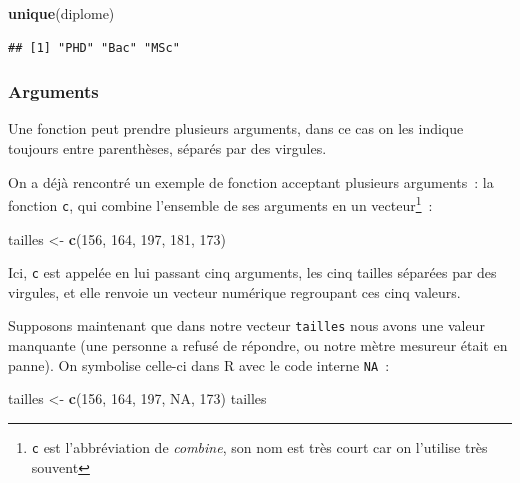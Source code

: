 \documentclass[12pt,]{book}
\newenvironment{Shaded}{\begin{snugshade}}{\end{snugshade}}
\newcommand{\DecValTok}[1]{\textcolor[rgb]{0.06,0.06,0.06}{#1}}
\newcommand{\KeywordTok}[1]{\textcolor[rgb]{0.27,0.27,0.27}{\textbf{#1}}}
\newcommand{\NormalTok}[1]{#1}
\newcommand{\OtherTok}[1]{\textcolor[rgb]{0.37,0.37,0.37}{#1}}
\newcommand{\StringTok}[1]{\textcolor[rgb]{0.5,0.5,0.5}{#1}}
\begin{document}
\begin{Shaded}
\begin{Highlighting}[]
\KeywordTok{unique}\NormalTok{(diplome)}
\end{Highlighting}
\end{Shaded}

\begin{verbatim}
## [1] "PHD" "Bac" "MSc"
\end{verbatim}

\hypertarget{arguments}{%
\subsubsection{Arguments}\label{arguments}}

Une fonction peut prendre plusieurs arguments, dans ce cas on les indique toujours entre parenthèses, séparés par des virgules.

On a déjà rencontré un exemple de fonction acceptant plusieurs arguments~: la fonction \texttt{c}, qui combine l'ensemble de ses arguments en un vecteur\footnote{\texttt{c} est l'abbréviation de \emph{combine}, son nom est très court car on l'utilise très souvent}~:

\begin{Shaded}
\begin{Highlighting}[]
\NormalTok{tailles <-}\StringTok{ }\KeywordTok{c}\NormalTok{(}\DecValTok{156}\NormalTok{, }\DecValTok{164}\NormalTok{, }\DecValTok{197}\NormalTok{, }\DecValTok{181}\NormalTok{, }\DecValTok{173}\NormalTok{)}
\end{Highlighting}
\end{Shaded}

Ici, \texttt{c} est appelée en lui passant cinq arguments, les cinq tailles séparées par des virgules, et elle renvoie un vecteur numérique regroupant ces cinq valeurs.

Supposons maintenant que dans notre vecteur \texttt{tailles} nous avons une valeur manquante (une personne a refusé de répondre, ou notre mètre mesureur était en panne). On symbolise celle-ci dans R avec le code interne \texttt{NA}~:

\begin{Shaded}
\begin{Highlighting}[]
\NormalTok{tailles <-}\StringTok{ }\KeywordTok{c}\NormalTok{(}\DecValTok{156}\NormalTok{, }\DecValTok{164}\NormalTok{, }\DecValTok{197}\NormalTok{, }\OtherTok{NA}\NormalTok{, }\DecValTok{173}\NormalTok{)}
\NormalTok{tailles}
\end{Highlighting}
\end{Shaded}
\end{document}

